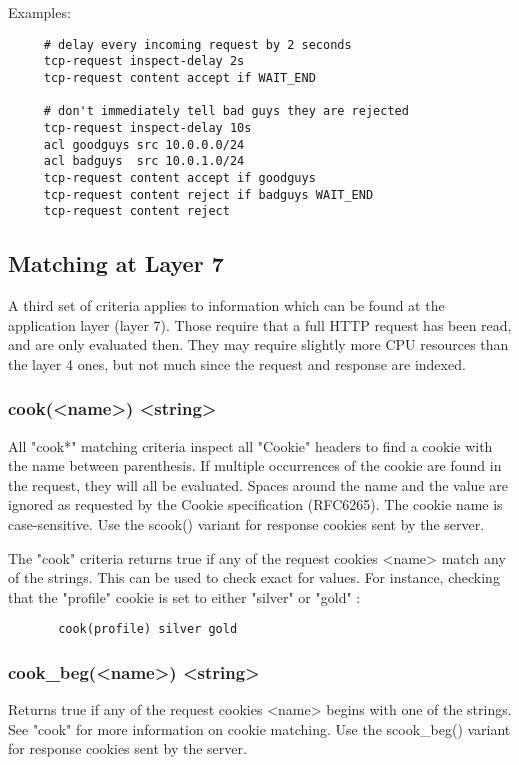   Examples:
  \begin{verbatim}
     # delay every incoming request by 2 seconds
     tcp-request inspect-delay 2s
     tcp-request content accept if WAIT_END

     # don't immediately tell bad guys they are rejected
     tcp-request inspect-delay 10s
     acl goodguys src 10.0.0.0/24
     acl badguys  src 10.0.1.0/24
     tcp-request content accept if goodguys
     tcp-request content reject if badguys WAIT_END
     tcp-request content reject
  \end{verbatim}

\subsection{Matching at Layer 7}

A third set of criteria applies to information which can be found at the
application layer (layer 7). Those require that a full HTTP request has been
read, and are only evaluated then. They may require slightly more CPU resources
than the layer 4 ones, but not much since the request and response are indexed.

\subsubsection[cook]{cook(<name>) <string>}
  All "cook*" matching criteria inspect all "Cookie" headers to find a cookie
  with the name between parenthesis. If multiple occurrences of the cookie are
  found in the request, they will all be evaluated. Spaces around the name and
  the value are ignored as requested by the Cookie specification (RFC6265). The
  cookie name is case-sensitive. Use the scook() variant for response cookies
  sent by the server.

  The "cook" criteria returns true if any of the request cookies <name> match
  any of the strings. This can be used to check exact for values. For instance,
  checking that the "profile" cookie is set to either "silver" or "gold" :
  \begin{verbatim}
       cook(profile) silver gold
  \end{verbatim}

\subsubsection[cook\_beg]{cook\_beg(<name>) <string>}
  Returns true if any of the request cookies <name> begins with one of the
  strings. See "cook" for more information on cookie matching. Use the
  scook\_beg() variant for response cookies sent by the server.

